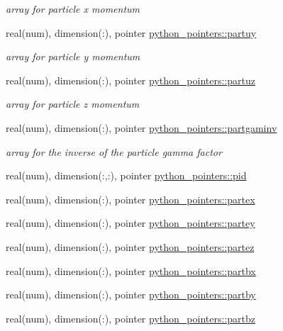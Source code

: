 \begin{DoxyCompactItemize}
$$\begin{DoxyCompactList}\small\item\em array for particle x momentum \end{DoxyCompactList}\item 
real(num), dimension(\+:), pointer \hyperlink{namespacepython__pointers_a60b173a25b047377d55cd66dfb5fad04}{python\+\_\+pointers\+::partuy}
\begin{DoxyCompactList}\small\item\em array for particle y momentum \end{DoxyCompactList}\item 
real(num), dimension(\+:), pointer \hyperlink{namespacepython__pointers_a98c8cf1649933f3239b068104d637d6c}{python\+\_\+pointers\+::partuz}
\begin{DoxyCompactList}\small\item\em array for particle z momentum \end{DoxyCompactList}\item 
real(num), dimension(\+:), pointer \hyperlink{namespacepython__pointers_a072266fc5f086ac68bdb72332b296a07}{python\+\_\+pointers\+::partgaminv}
\begin{DoxyCompactList}\small\item\em array for the inverse of the particle gamma factor \end{DoxyCompactList}\item 
real(num), dimension(\+:,\+:), pointer \hyperlink{namespacepython__pointers_a8a754456a1a3440c897f9a6249782713}{python\+\_\+pointers\+::pid}
\item 
real(num), dimension(\+:), pointer \hyperlink{namespacepython__pointers_ad4fc57017cff184e92ae60ff0006c62c}{python\+\_\+pointers\+::partex}
\item 
real(num), dimension(\+:), pointer \hyperlink{namespacepython__pointers_af358e4be4f10aeff30df94181589c382}{python\+\_\+pointers\+::partey}
\item 
real(num), dimension(\+:), pointer \hyperlink{namespacepython__pointers_a61f858897e873f37d7bb3e355e2b9740}{python\+\_\+pointers\+::partez}
\item 
real(num), dimension(\+:), pointer \hyperlink{namespacepython__pointers_a9de58f9a1f88381cac4457014ee8859f}{python\+\_\+pointers\+::partbx}
\item 
real(num), dimension(\+:), pointer \hyperlink{namespacepython__pointers_aab1fc483934951de61c30198fa476e40}{python\+\_\+pointers\+::partby}
\item 
real(num), dimension(\+:), pointer \hyperlink{namespacepython__pointers_a9c50a4b64ff01114243eebc0dc729ae8}{python\+\_\+pointers\+::partbz}
\end{DoxyCompactItemize}
